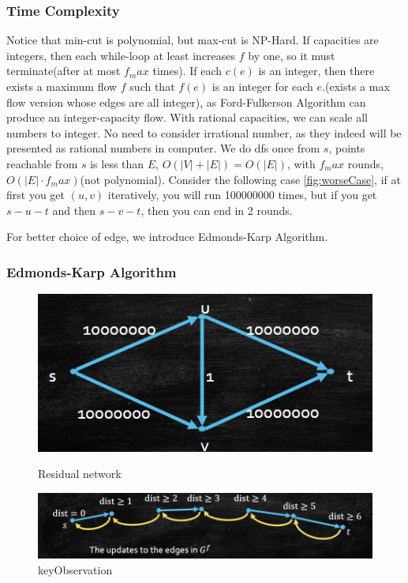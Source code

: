 \subsubsection{Time Complexity}
Notice that min-cut is polynomial, but max-cut is NP-Hard.
If capacities are integers, then each while-loop at least increases $f$ by one, so it must terminate(after at most $f_max$ times).
If each $c(e)$ is an integer, then there exists a maximum flow $f$ such that $f(e)$ is an integer for each $e$.(exists a max flow version whose edges are all integer), as Ford-Fulkerson Algorithm can produce an integer-capacity flow.
With rational capacities, we can scale all numbers to integer. No need to consider irrational number, as they indeed will be presented as rational numbers in computer.
We do dfs once from $s$, points reachable from $s$ is less than $E$, $O(|V|+|E|)=O(|E|)$, with $f_max$ rounds, $O(|E|\cdot f_max)$(not polynomial).
Consider the following case \ref{fig:worseCase}, if at first you get $(u,v)$ iteratively, you will run 100000000 times, but if you get $s-u-t$ and then $s-v-t$, then you can end in 2 rounds.

For better choice of edge, we introduce Edmonds-Karp Algorithm.




\subsubsection{Edmonds-Karp Algorithm}
\begin{figure}[htbp]
    \centering
    \begin{minipage}{0.3\linewidth}
        \centering
        \includegraphics[width=1\linewidth]{Notes/fig/worseCase.png}
        \caption{Residual network}
        \label{fig:worseCase}
    \end{minipage}
    \begin{minipage}{0.65\linewidth}
        \centering
        \includegraphics[width=1\linewidth]{Notes/fig/keyObservation.png}
        \caption{keyObservation}
        \label{fig:keyObservation}
    \end{minipage}
\end{figure}

